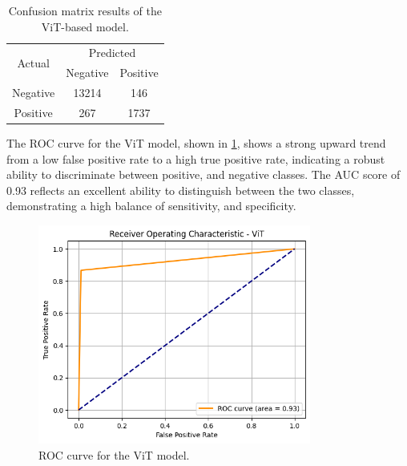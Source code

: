 \documentclass[../main]{subfiles}
\begin{document}
\begin{table}[h!]
    \centering
    \begin{tabular}{|c|c|c|}
        \hline
        \multirow{2}{*}{Actual} & \multicolumn{2}{c|}{Predicted} \\ \cline{2-3}
                                & Negative         & Positive         \\ \hline
        Negative                & 13214            & 146              \\ \hline
        Positive                & 267              & 1737              \\ \hline
    \end{tabular}
    \caption{Confusion matrix results of the ViT-based model.}
    \label{tab:confusion-matrix-vit}
\end{table}

\noindent The ROC curve for the ViT model, shown in \ref{fig:roc-vit}, shows a strong upward trend from a low false positive rate to a high true positive rate, indicating a robust ability to discriminate between positive, and negative classes. The AUC score of 0.93 reflects an excellent ability to distinguish between the two classes, demonstrating a high balance of sensitivity, and specificity.

\begin{figure}[h!]
	\centering
	\includegraphics[width=0.8\textwidth]{assets/roc_vit.png}
	\caption{ROC curve for the ViT model.}
    \label{fig:roc-vit}
\end{figure}

\clearpage
\end{document}
